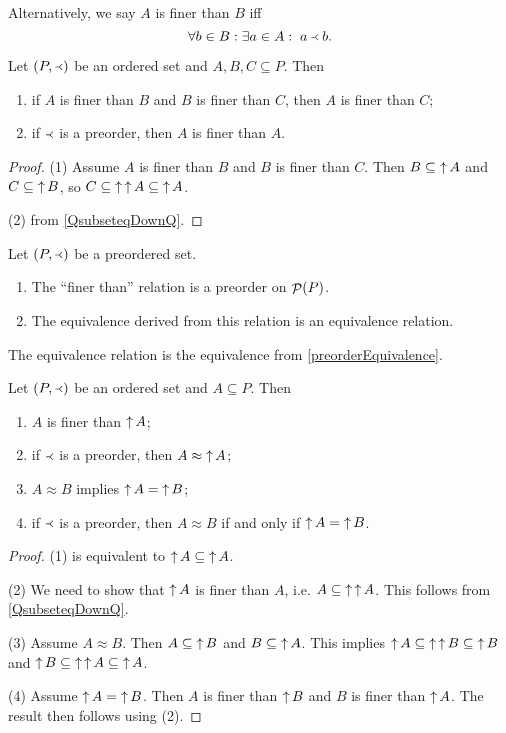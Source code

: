 Alternatively, we say $A$ is finer than $B$ iff
\[ \forall b\in B: \exists a\in A: \; a \Yleft b. \]

\begin{lemma}
Let $\left( P,\Yleft \right)$ be an ordered set and $A,B,C \subseteq P$. Then
\begin{enumerate}
\item if $A$ is finer than $B$ and $B$ is finer than $C$, then $A$ is finer than $C$;
\item if $\Yleft$ is a preorder, then $A$ is finer than $A$.
\end{enumerate}
\end{lemma}
\begin{proof}
(1) Assume $A$ is finer than $B$ and $B$ is finer than $C$. Then $B \subseteq \mathop{\uparrow} A$ and $C\subseteq \mathop{\uparrow} B$, so $C \subseteq \mathop{\uparrow}\mathop{\uparrow} A \subseteq \mathop{\uparrow} A$.

(2) from \ref{QsubseteqDownQ}.
\end{proof}
\begin{corollary}
Let $\left( P,\Yleft \right)$ be a preordered set.
\begin{enumerate}
\item The ``finer than'' relation is a preorder on $\mathop{\mathcal{P}}(P)$.
\item The equivalence derived from this relation is an equivalence relation.
\end{enumerate}
\end{corollary}
The equivalence relation is the equivalence from \ref{preorderEquivalence}.

\begin{lemma}
Let $\left( P,\Yleft \right)$ be an ordered set and $A \subseteq P$. Then
\begin{enumerate}
\item $A$ is finer than $\mathop{\uparrow} A$;
\item if $\Yleft$ is a preorder, then $A \approx \mathop{\uparrow} A$;
\item $A \approx B$ implies $\mathop{\uparrow} A = \mathop{\uparrow} B$;
\item if $\Yleft$ is a preorder, then $A \approx B$ \textup{if and only if} $\mathop{\uparrow} A = \mathop{\uparrow} B$.
\end{enumerate}
\end{lemma}
\begin{proof}
(1) is equivalent to $\mathop{\uparrow} A \subseteq \mathop{\uparrow} A$.

(2) We need to show that $\mathop{\uparrow} A$ is finer than $A$, i.e. $A\subseteq \mathop{\uparrow}\mathop{\uparrow} A$. This follows from \ref{QsubseteqDownQ}.

(3) Assume $A \approx B$. Then $A \subseteq \mathop{\uparrow} B$ and $B \subseteq \mathop{\uparrow} A$. This implies $\mathop{\uparrow} A \subseteq \mathop{\uparrow}\mathop{\uparrow} B \subseteq \mathop{\uparrow} B$ and $\mathop{\uparrow} B \subseteq \mathop{\uparrow}\mathop{\uparrow} A \subseteq \mathop{\uparrow} A$.

(4) Assume $\mathop{\uparrow} A = \mathop{\uparrow} B$. Then $A$ is finer than $\mathop{\uparrow} B$ and $B$ is finer than $\mathop{\uparrow} A$. The result then follows using (2).
\end{proof}


